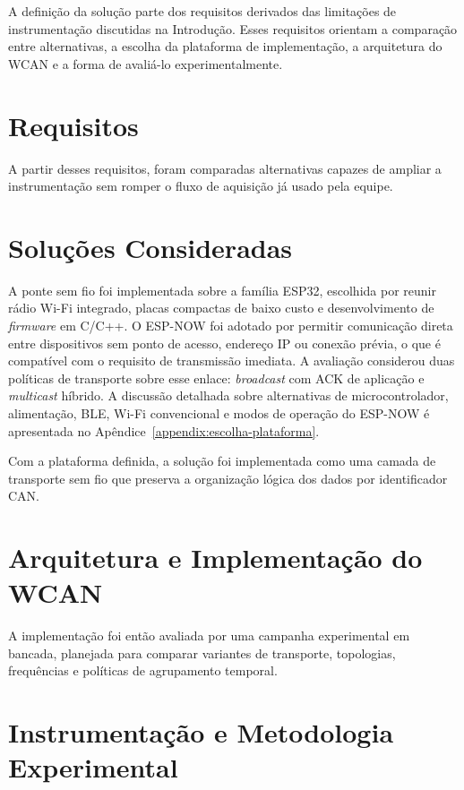 A definição da solução parte dos requisitos derivados das limitações de
instrumentação discutidas na Introdução. Esses requisitos orientam a comparação
entre alternativas, a escolha da plataforma de implementação, a arquitetura do
WCAN e a forma de avaliá-lo experimentalmente.

\section{Requisitos}
\label{chapter:requisitos}


A partir desses requisitos, foram comparadas alternativas capazes de ampliar a
instrumentação sem romper o fluxo de aquisição já usado pela equipe.

\section{Soluções Consideradas}
\label{chapter:solucoes-consideradas}


A ponte sem fio foi implementada sobre a família ESP32, escolhida por reunir
rádio Wi-Fi integrado, placas compactas de baixo custo e desenvolvimento de
\emph{firmware} em C/C++. O ESP-NOW foi adotado por permitir comunicação direta
entre dispositivos sem ponto de acesso, endereço IP ou conexão prévia, o que é
compatível com o requisito de transmissão imediata. A avaliação considerou duas
políticas de transporte sobre esse enlace: \emph{broadcast} com ACK de aplicação
e \emph{multicast} híbrido. A discussão detalhada sobre alternativas de
microcontrolador, alimentação, BLE, Wi-Fi convencional e modos de operação do
ESP-NOW é apresentada no Apêndice~\ref{appendix:escolha-plataforma}.

Com a plataforma definida, a solução foi implementada como uma camada de
transporte sem fio que preserva a organização lógica dos dados por identificador
CAN.

\section{Arquitetura e Implementação do WCAN}


A implementação foi então avaliada por uma campanha experimental em bancada,
planejada para comparar variantes de transporte, topologias, frequências e
políticas de agrupamento temporal.

\section{Instrumentação e Metodologia Experimental}
\label{chapter:metodos}

